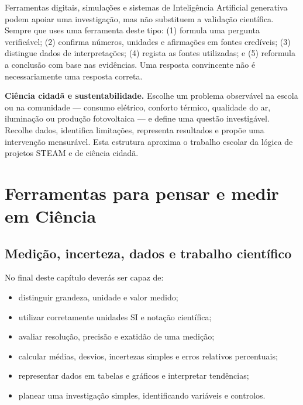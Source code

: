 \documentclass[11pt,a4paper,oneside]{book}
\begin{document}
\begin{metodo}[title=Investigar com fontes digitais e Inteligência Artificial]
Ferramentas digitais, simulações e sistemas de Inteligência Artificial generativa podem apoiar uma investigação, mas não substituem a validação científica. Sempre que uses uma ferramenta deste tipo: (1) formula uma pergunta verificável; (2) confirma números, unidades e afirmações em fontes credíveis; (3) distingue dados de interpretações; (4) regista as fontes utilizadas; e (5) reformula a conclusão com base nas evidências. Uma resposta convincente não é necessariamente uma resposta correta.
\end{metodo}

\begin{stem}
\textbf{Ciência cidadã e sustentabilidade.} Escolhe um problema observável na escola ou na comunidade — consumo elétrico, conforto térmico, qualidade do ar, iluminação ou produção fotovoltaica — e define uma questão investigável. Recolhe dados, identifica limitações, representa resultados e propõe uma intervenção mensurável. Esta estrutura aproxima o trabalho escolar da lógica de projetos STEAM e de ciência cidadã.
\end{stem}

\tableofcontents

\mainmatter

\part{Ferramentas para pensar e medir em Ciência}

\chapter{Medição, incerteza, dados e trabalho científico}

\begin{objetivos}
No final deste capítulo deverás ser capaz de:
\begin{itemize}
  \item distinguir grandeza, unidade e valor medido;
  \item utilizar corretamente unidades SI e notação científica;
  \item avaliar resolução, precisão e exatidão de uma medição;
  \item calcular médias, desvios, incertezas simples e erros relativos percentuais;
  \item representar dados em tabelas e gráficos e interpretar tendências;
  \item planear uma investigação simples, identificando variáveis e controlos.
\end{itemize}
\end{objetivos}
\end{document}
